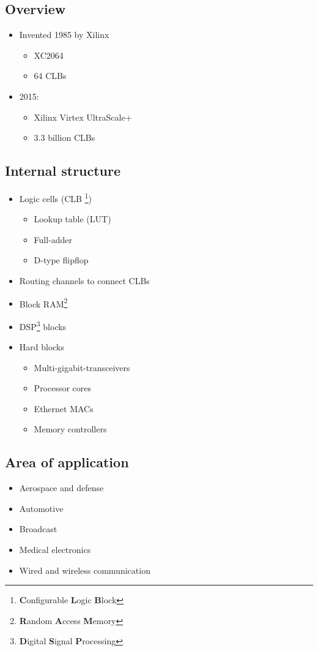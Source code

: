 \documentclass[a4paper, landscape, twocolumn, 11pt]{article}
\begin{document}
\subsection*{Overview}
\begin{itemize}
    \item Invented 1985 by Xilinx
    \begin{itemize}
        \item XC2064
        \item 64 CLBs
    \end{itemize}
    \item 2015:
    \begin{itemize}
        \item Xilinx Virtex UltraScale+
        \item 3.3 billion CLBs
    \end{itemize}
\end{itemize}

\subsection*{Internal structure}
\begin{itemize}
    \item Logic cells (CLB 
        \footnote{\textbf{C}onfigurable \textbf{L}ogic \textbf{B}lock})
    \begin{itemize}
        \item Lookup table (LUT)
        \item Full-adder
        \item D-type flipflop
    \end{itemize}
    \item Routing channels to connect CLBs
    \item Block RAM\footnote{\textbf{R}andom \textbf{A}ccess \textbf{M}emory}
    \item DSP\footnote{\textbf{D}igital \textbf{S}ignal \textbf{P}rocessing} 
        blocks
    \item Hard blocks
    \begin{itemize}
        \item Multi-gigabit-transceivers
        \item Processor cores
        \item Ethernet MACs
        \item Memory controllers
    \end{itemize}
\end{itemize}

\subsection*{Area of application}
\begin{itemize}
    \item Aerospace and defense
    \item Automotive
    \item Broadcast
    \item Medical electronics
    \item Wired and wireless communication
\end{itemize}
\end{document}
